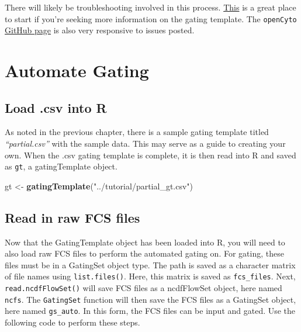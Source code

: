 \documentclass[]{book}
\newenvironment{Shaded}{\begin{snugshade}}{\end{snugshade}}
\newcommand{\KeywordTok}[1]{\textcolor[rgb]{0.13,0.29,0.53}{\textbf{#1}}}
\newcommand{\NormalTok}[1]{#1}
\newcommand{\StringTok}[1]{\textcolor[rgb]{0.31,0.60,0.02}{#1}}
\begin{document}
There will likely be troubleshooting involved in this process. \href{https://www.bioconductor.org/packages/devel/bioc/vignettes/openCyto/inst/doc/HowToWriteCSVTemplate.html\#14_gating_method_that_generates_multiple_populations}{This} is a great place to start if you're seeking more information on the gating template. The \texttt{openCyto} \href{https://github.com/RGLab/openCyto}{GitHub page} is also very responsive to issues posted.

\hypertarget{automate-gating}{%
\chapter{Automate Gating}\label{automate-gating}}

\hypertarget{load-.csv-into-r}{%
\section{Load .csv into R}\label{load-.csv-into-r}}

As noted in the previous chapter, there is a sample gating template titled \emph{``partial.csv''} with the sample data. This may serve as a guide to creating your own. When the .csv gating template is complete, it is then read into R and saved as \texttt{gt}, a gatingTemplate object.

\begin{Shaded}
\begin{Highlighting}[]
\NormalTok{gt <-}\StringTok{ }\KeywordTok{gatingTemplate}\NormalTok{(}\StringTok{"../tutorial/partial_gt.csv"}\NormalTok{)}
\end{Highlighting}
\end{Shaded}

\hypertarget{read-in-raw-fcs-files}{%
\section{Read in raw FCS files}\label{read-in-raw-fcs-files}}

Now that the GatingTemplate object has been loaded into R, you will need to also load raw FCS files to perform the automated gating on. For gating, these files must be in a GatingSet object type. The path is saved as a character matrix of file names using \texttt{list.files()}. Here, this matrix is saved as \texttt{fcs\_files}. Next, \texttt{read.ncdfFlowSet()} will save FCS files as a ncdfFlowSet object, here named \texttt{ncfs}. The \texttt{GatingSet} function will then save the FCS files as a GatingSet object, here named \texttt{gs\_auto}. In this form, the FCS files can be input and gated. Use the following code to perform these steps.
\end{document}
